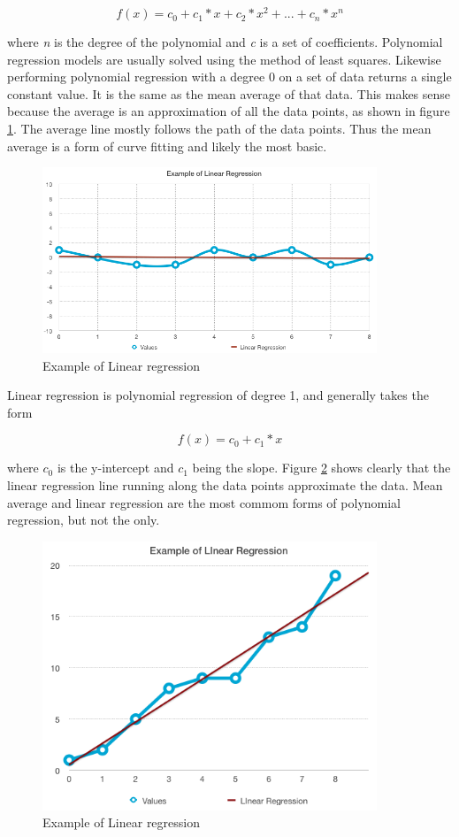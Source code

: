 \documentclass[ppgc,mestrado,english]{iiufrgs}
\begin{document}
\begin{equation} \label{eq:polynomialForm}
f(x) = c_0 + c_1 * x + c_2 * x^2 + ... + c_n * x^n
\end{equation}

where \emph{n} is the degree of the polynomial and \emph{c} is a set of coefficients. Polynomial regression models are usually solved using the method of least squares. Likewise performing polynomial regression with a degree 0 on a set of data returns a single constant value. It is the same as the mean average of that data. This makes sense because the average is an approximation of all the data points, as shown in figure \ref{fig:degree0}. The average line mostly follows the path of the data points. Thus the mean average is a form of curve fitting and likely the most basic.

\begin{figure}[ht!]
\centering
\includegraphics[width=100mm]{degree0.png}
\caption{Example of Linear regression}
\label{fig:degree0}
\end{figure}

Linear regression is polynomial regression of degree 1, and generally takes the form

\begin{equation} \label{eq:polynomialFormSmall}
f(x) = c_0 + c_1 * x
\end{equation}

where \emph{$c_0$} is the y-intercept and \emph{$c_1$} being the slope. Figure \ref{fig:degree1} shows clearly that the linear regression line running along the data points approximate the data. Mean average and linear regression are the most commom forms of polynomial regression, but not the only.

\begin{figure}[ht!]
\centering
\includegraphics[width=100mm]{degree1.png}
\caption{Example of Linear regression}
\label{fig:degree1}
\end{figure}
\end{document}
